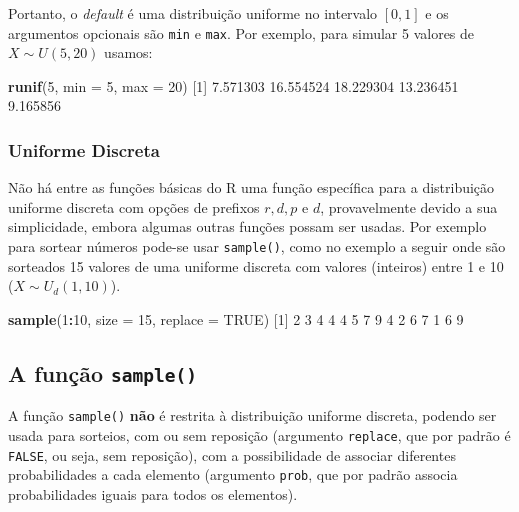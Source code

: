 \documentclass[10pt,a4paper]{book}
\newenvironment{Shaded}{\begin{snugshade}}{\end{snugshade}}
\newcommand{\KeywordTok}[1]{\textcolor[rgb]{0.13,0.29,0.53}{\textbf{#1}}}
\newcommand{\DataTypeTok}[1]{\textcolor[rgb]{0.13,0.29,0.53}{#1}}
\newcommand{\DecValTok}[1]{\textcolor[rgb]{0.00,0.00,0.81}{#1}}
\newcommand{\FloatTok}[1]{\textcolor[rgb]{0.00,0.00,0.81}{#1}}
\newcommand{\OtherTok}[1]{\textcolor[rgb]{0.56,0.35,0.01}{#1}}
\newcommand{\OperatorTok}[1]{\textcolor[rgb]{0.81,0.36,0.00}{\textbf{#1}}}
\newcommand{\NormalTok}[1]{#1}
\begin{document}
Portanto, o \emph{default} é uma distribuição uniforme no intervalo
\([0,1]\) e os argumentos opcionais são \texttt{min} e \texttt{max}. Por
exemplo, para simular 5 valores de \(X \sim U(5, 20)\) usamos:

\begin{Shaded}
\begin{Highlighting}[]
\KeywordTok{runif}\NormalTok{(}\DecValTok{5}\NormalTok{, }\DataTypeTok{min =} \DecValTok{5}\NormalTok{, }\DataTypeTok{max =} \DecValTok{20}\NormalTok{)}
\NormalTok{[}\DecValTok{1}\NormalTok{]  }\FloatTok{7.571303} \FloatTok{16.554524} \FloatTok{18.229304} \FloatTok{13.236451}  \FloatTok{9.165856}
\end{Highlighting}
\end{Shaded}

\subsubsection{Uniforme Discreta}\label{uniforme-discreta}

Não há entre as funções básicas do R uma função específica para a
distribuição uniforme discreta com opções de prefixos \(r,d,p\) e \(d\),
provavelmente devido a sua simplicidade, embora algumas outras funções
possam ser usadas. Por exemplo para sortear números pode-se usar
\texttt{sample()}, como no exemplo a seguir onde são sorteados 15
valores de uma uniforme discreta com valores (inteiros) entre 1 e 10
(\(X \sim U_d(1,10)\)).

\begin{Shaded}
\begin{Highlighting}[]
\KeywordTok{sample}\NormalTok{(}\DecValTok{1}\OperatorTok{:}\DecValTok{10}\NormalTok{, }\DataTypeTok{size =} \DecValTok{15}\NormalTok{, }\DataTypeTok{replace =} \OtherTok{TRUE}\NormalTok{)}
\NormalTok{ [}\DecValTok{1}\NormalTok{] }\DecValTok{2} \DecValTok{3} \DecValTok{4} \DecValTok{4} \DecValTok{4} \DecValTok{5} \DecValTok{7} \DecValTok{9} \DecValTok{4} \DecValTok{2} \DecValTok{6} \DecValTok{7} \DecValTok{1} \DecValTok{6} \DecValTok{9}
\end{Highlighting}
\end{Shaded}

\subsection{\texorpdfstring{A função
\texttt{sample()}}{A função sample()}}\label{a-funuxe7uxe3o-sample}

A função \texttt{sample()} \textbf{não} é restrita à distribuição
uniforme discreta, podendo ser usada para sorteios, com ou sem reposição
(argumento \texttt{replace}, que por padrão é \texttt{FALSE}, ou seja,
sem reposição), com a possibilidade de associar diferentes
probabilidades a cada elemento (argumento \texttt{prob}, que por padrão
associa probabilidades iguais para todos os elementos).
\end{document}
